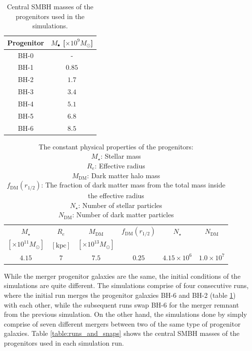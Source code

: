\documentclass[english, oneside]{HYgradu}
\begin{document}
\begin{table}
	\begin{center}
		\begin{tabular}{c c}
		\hline
		\hline
		Progenitor & $M_\bullet$ [$\times 10^9 M_\odot$] \\
		\hline
		BH-0 & - \\
		BH-1 & $0.85$ \\
		BH-2 & $1.7$ \\
		BH-3 & $3.4$ \\
		BH-4 & $5.1$ \\
		BH-5 & $6.8$ \\
		BH-6 & $8.5$ \\
		\hline
		\end{tabular}
	\end{center}
	\caption{Central SMBH masses of the progenitors used in the simulations.}
	\label{table:progenitors}
\end{table}

\begin{table}
	\begin{center}
		\begin{tabular}{c c c c c c}
		\hline
		\hline
		$M_\star$ & $R_e$ & $M_\mathrm{DM}$ & $f_\mathrm{DM}(r_{1/2})$ & $N_\star$ & $N_\mathrm{DM}$ \\
		$[\times 10^{11} M_\odot]$ & $[\mathrm{kpc}]$ & $[\times 10^{13} M_\odot]$ & & & \\
		\hline
		$4.15$ & $7$ & $7.5$ & $0.25$ & $4.15 \times 10^6$ & $1.0 \times 10^7$ \\
		\hline
		\end{tabular}
	\end{center}
	\caption{The constant physical properties of the progenitors: \\
	$M_\star$: Stellar mass \\
	$R_e$: Effective radius \\
	$M_\mathrm{DM}$: Dark matter halo mass\\
	$f_\mathrm{DM}(r_{1/2})$: The fraction of dark matter mass from the total mass inside the effective radius \\
	$N_\star$: Number of stellar particles \\
	$N_\mathrm{DM}$: Number of dark matter particles}
	\label{table:properties}
\end{table}

While the merger progenitor galaxies are the same, the initial conditions of the simulations are quite different. The \cite{Mannerkoski2019} simulations comprise of four consecutive runs, where the initial run merges the progenitor galaxies BH-6 and BH-2 (table \ref{table:progenitors}) with each other, while the subsequent runs swap BH-6 for the merger remnant from the previous simulation. On the other hand, the simulations done by \cite{Rantala2018} simply comprise of seven different mergers between two of the same type of progenitor galaxies. Table \ref{table:runs_and_snaps} shows the central SMBH masses of the progenitors used in each simulation run.
\end{document}
